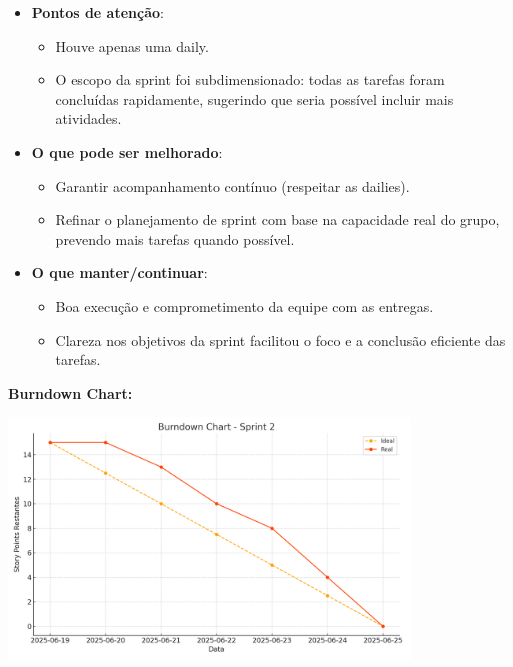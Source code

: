 \begin{itemize}
  \item \textbf{Pontos de atenção}:
  \begin{itemize}
    \item Houve apenas uma daily.
    \item O escopo da sprint foi subdimensionado: todas as tarefas foram concluídas rapidamente, sugerindo que seria possível incluir mais atividades.
  \end{itemize}

  \item \textbf{O que pode ser melhorado}:
  \begin{itemize}
    \item Garantir acompanhamento contínuo (respeitar as dailies).
    \item Refinar o planejamento de sprint com base na capacidade real do grupo, prevendo mais tarefas quando possível.
  \end{itemize}

  \item \textbf{O que manter/continuar}:
  \begin{itemize}
    \item Boa execução e comprometimento da equipe com as entregas.
    \item Clareza nos objetivos da sprint facilitou o foco e a conclusão eficiente das tarefas.
  \end{itemize}
\end{itemize}

\vspace{1em}
\noindent\textbf{Burndown Chart:}

\begin{center}
  \includegraphics[width=0.8\textwidth]{pictures/burndown_sprint2.png}
\end{center}
